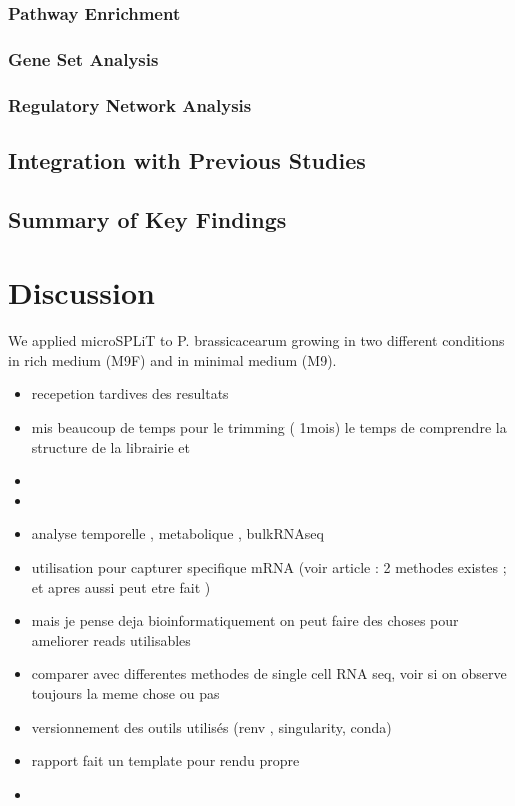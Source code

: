 \documentclass[
  11pt,
  a4paper,
]{report}
\begin{document}
\subsection{Pathway Enrichment}\label{pathway-enrichment}

\subsection{Gene Set Analysis}\label{gene-set-analysis}

\subsection{Regulatory Network
Analysis}\label{regulatory-network-analysis}

\section{Integration with Previous
Studies}\label{integration-with-previous-studies}

\section{Summary of Key Findings}\label{summary-of-key-findings}


\chapter{Discussion}\label{discussion}

We applied microSPLiT to P. brassicacearum growing in two different
conditions in rich medium (M9F) and in minimal medium (M9).

\begin{itemize}
\item
  recepetion tardives des resultats
\item
  mis beaucoup de temps pour le trimming ( 1mois) le temps de comprendre
  la structure de la librairie et
\item
\item
\item
  analyse temporelle , metabolique , bulkRNAseq
\item
  utilisation pour capturer specifique mRNA (voir article : 2 methodes
  existes ; et apres aussi peut etre fait )
\item
  mais je pense deja bioinformatiquement on peut faire des choses pour
  ameliorer reads utilisables
\item
  comparer avec differentes methodes de single cell RNA seq, voir si on
  observe toujours la meme chose ou pas
\item
  versionnement des outils utilisés (renv , singularity, conda)
\item
  rapport fait un template pour rendu propre
\item
\end{itemize}
\end{document}
